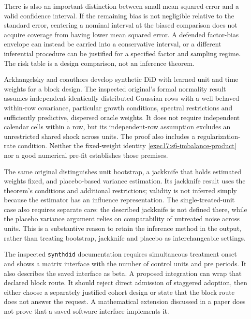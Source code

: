 There is also an important distinction between small mean squared error
and a valid confidence interval. If the remaining bias is not negligible
relative to the standard error, centering a nominal interval at the biased
comparison does not acquire coverage from having lower mean squared error.
A defended factor-bias envelope can instead be carried into a conservative
interval, or a different inferential procedure can be justified for a
specified factor and sampling regime. The risk table is a design
comparison, not an inference theorem.

Arkhangelsky and coauthors develop synthetic DiD with learned unit and
time weights for a block design. The inspected original's formal
normality result assumes independent identically distributed Gaussian
rows with a well-behaved within-row covariance, particular growth
conditions, spectral restrictions and sufficiently predictive, dispersed
oracle weights. It does not require independent calendar cells within a
row, but its independent-row assumption excludes an unrestricted shared
shock across units. The proof also includes a regularization-rate
condition. Neither the fixed-weight identity
\eqref{exec17:s6-imbalance-product} nor a good numerical pre-fit
establishes those premises.\citep{synthdid2021}

The same original distinguishes unit bootstrap, a jackknife that holds
estimated weights fixed, and placebo-based variance estimation. Its
jackknife result uses the theorem's conditions and additional restrictions;
validity is not inferred simply because the estimator has an influence
representation. The single-treated-unit case also requires separate care:
the described jackknife is not defined there, while the placebo
variance argument relies on comparability of untreated noise across
units. This is a substantive reason to retain the inference method in
the output, rather than treating bootstrap, jackknife and placebo as
interchangeable settings.\citep{synthdid2021}

The inspected \texttt{synthdid} documentation requires simultaneous
treatment onset and shows a matrix interface with the number of control
units and pre periods. It also describes the saved interface as beta.
A proposed integration can wrap that declared block route. It should
reject direct admission of staggered adoption, then either choose a
separately justified cohort design or state that the block route does not
answer the request. A mathematical extension discussed in a paper does
not prove that a saved software interface implements it.\citep{sw_synthdid}


